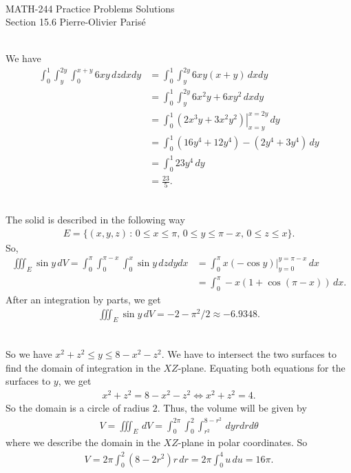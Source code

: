 


	\noindent \hrulefill \\
	MATH-244 \semester \hfill Practice Problems Solutions\\
	Section 15.6 \hfill Pierre-Olivier Paris{\'e} \\\vspace*{-1cm}
	
	\noindent\hrulefill
	
	\spc	

	\\
	We have
		\begin{align*}
		\int_0^1 \int_y^{2y} \int_0^{x + y} 6xy \, dz dx dy &= \int_0^1 \int_y^{2y} 6 xy (x + y) \, dx dy \\
		&= \int_0^1 \int_y^{2y} 6x^2y + 6xy^2 \, dx dy \\
		&= \int_0^1 \left. (2x^3 y + 3 x^2y^2 ) \right|_{x = y}^{x = 2y} \, dy \\
		&= \int_0^1 (16y^4 + 12y^4) - (2y^4 + 3y^4) \, dy \\
		&= \int_0^1 23 y^4 \, dy \\
		&= \frac{23}{5} .
		\end{align*}
	
	\spc 
	
	\\
	The solid is described in the following way
		\begin{align*}
		E = \{ (x, y , z) \, : \, 0 \leq x \leq \pi \text{, } 0 \leq y \leq \pi - x \text{, } 0 \leq z \leq x \} .
		\end{align*}
	So,
		\begin{align*}
		\iiint_E \sin y \, dV = \int_0^\pi \int_0^{\pi - x} \int_0^x \sin y \, dz dy dx &= \int_0^\pi x \left. (-\cos y) \right|_{y =0}^{y = \pi - x} \, dx \\
		&= \int_0^\pi -x (1 + \cos (\pi - x)) \, dx .
		\end{align*}
	After an integration by parts, we get
		\begin{align*}
		\iiint_E \sin y \, dV = -2 - \pi^2/2 \approx -6.9348 .
		\end{align*}
	
	\spc 
	
	\\
	So we have $x^2 + z^2 \leq y \leq 8 - x^2 - z^2$. We have to intersect the two surfaces to find the domain of integration in the $XZ$-plane. Equating both equations for the surfaces to $y$, we get
		\begin{align*}
		x^2 + z^2 = 8 - x^2 - z^2 \iff x^2 + z^2 = 4 .
		\end{align*}
	So the domain is a circle of radius $2$. Thus, the volume will be given by
		\begin{align*}
		V = \iiint_E \, dV = \int_0^{2\pi} \int_0^{2} \int_{r^2}^{8 - r^2} \, dy r dr d\theta
		\end{align*}
	where we describe the domain in the $XZ$-plane in polar coordinates. So
		\begin{align*}
		V = 2\pi \int_0^2 (8 - 2r^2) r \, dr = 2\pi  \int_0^4 u \, du = 16 \pi .
		\end{align*}
	

